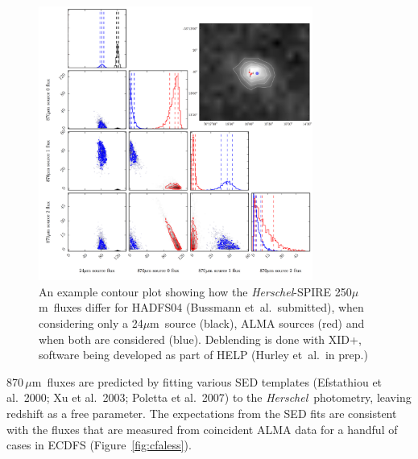 \documentclass[12pt,a4paper]{article}
\newcommand{\herschel}{{\it Herschel}}
\newcommand{\ea}{et~al.}
\newcommand{\micron}{$\mu$m}
\begin{document}
\begin{figure}
\centering\includegraphics[width=9cm]{250XID+beta_ADFS04_merged.pdf} 
\caption{An example contour plot showing how the \herschel-SPIRE 250\micron\ fluxes differ for HADFS04 (Bussmann \ea\ submitted), when considering only a 24\micron\  source (black), ALMA sources (red) and when both are considered (blue). Deblending is done with XID+, software being developed as part of HELP (Hurley \ea\  in prep.)}
\label{fig:triplots}
\end{figure}

870\,\micron\ fluxes are predicted by fitting various SED
templates (Efstathiou et al.\ 2000; Xu et al.\
2003; Poletta et al.\ 2007) to the \herschel\ photometry, leaving
redshift as a free parameter. The expectations from the SED fits are
consistent with the fluxes that are measured from coincident ALMA data for a handful of cases
in ECDFS (Figure~\ref{fig:cfaless}). 
\end{document}
